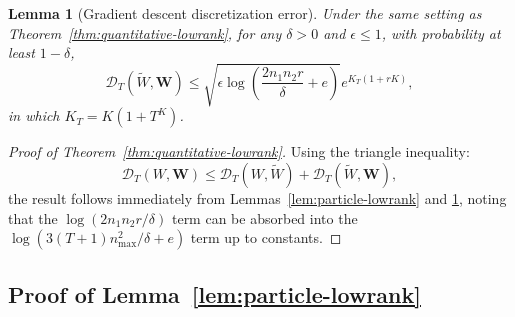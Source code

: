 \documentclass[nohyperref]{article}
\theoremstyle{plain}
\newtheorem{lemma}[theorem]{Lemma}
\theoremstyle{definition}
\theoremstyle{remark}
\begin{document}
\begin{lemma}[Gradient descent discretization error]
\label{lem:gradient-lowrank}
Under the same setting as Theorem~\ref{thm:quantitative-lowrank}, for any $\delta > 0$ and $\epsilon \le 1$, with probability at least $1-\delta$,
\[
\mathscr{D}_T(\tilde{W}, \mathbf{W}) \le \sqrt{\epsilon\log\left(\frac{2n_1n_2r}{\delta} + e\right)}e^{K_T(1+rK)},
\]
in which $K_T = K(1+T^K)$.
\end{lemma}

\begin{proof}[Proof of Theorem~\ref{thm:quantitative-lowrank}]
Using the triangle inequality:
\[
\mathscr{D}_T(W, \mathbf{W}) \le \mathscr{D}_T(W, \tilde{W}) + \mathscr{D}_T(\tilde{W}, \mathbf{W}),
\]
the result follows immediately from Lemmas~\ref{lem:particle-lowrank} and \ref{lem:gradient-lowrank}, noting that the $\log(2n_1n_2r/\delta)$ term can be absorbed into the $\log(3(T+1)n_{\max}^2/\delta + e)$ term up to constants.
\end{proof}

\subsection{Proof of Lemma~\ref{lem:particle-lowrank}}
\end{document}
